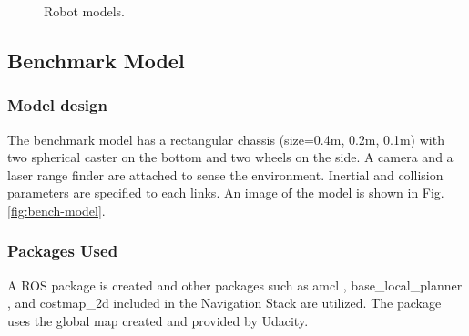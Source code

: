\documentclass[10pt,journal,compsoc]{IEEEtran}
\begin{document}
\begin{figure}[thpb]
\centering
  \hfill
  \caption{Robot models.}
\end{figure}

\subsection{Benchmark Model}
\subsubsection{Model design}
The benchmark model has a rectangular chassis (size=0.4m, 0.2m, 0.1m) with two spherical caster on the bottom and two wheels on the side. A camera and a laser range finder are attached to sense the environment. Inertial and collision parameters are specified to each links. An image of the model is shown in Fig. \ref{fig:bench-model}.

\subsubsection{Packages Used}
A ROS package is created and other packages such as amcl \cite{ROS:amcl}, base\_local\_planner \cite{ROS:base-local-planner}, and costmap\_2d \cite{ROS:costmap-2d} included in the Navigation Stack are utilized. The package uses the global map created and provided by Udacity.
\end{document}

